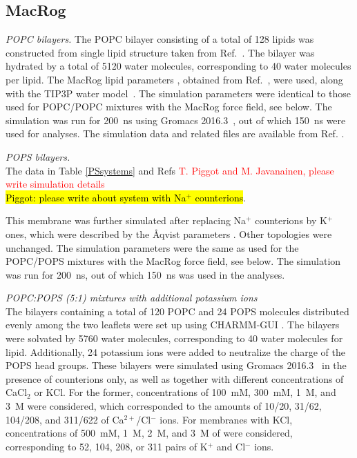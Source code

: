 \documentclass[journal=jpcbfk]{achemso}
\newcommand{\todo}[1]{\textcolor{red}{#1}}
\begin{document}
\subsection{MacRog}
\noindent
{\it POPC bilayers.} 
The POPC bilayer consisting of a total of 128 lipids was constructed from single lipid structure taken 
from Ref.~. The bilayer was hydrated by a total of 5120 water 
molecules, corresponding to 40 water molecules per lipid.
The MacRog lipid parameters \cite{kulig15b}, obtained from Ref.~, were used,
along with the TIP3P water model~\cite{jorgensen83}. The simulation parameters were identical to those used for 
POPC/POPC mixtures with the MacRog force field, see below. The simulation was run for 200~ns using Gromacs 2016.3~\cite{abraham2015gromacs}, 
out of which 150~ns were used for analyses. The simulation data and related files are available from Ref. .

\noindent
{\it POPS bilayers.} \\
The data in Table \ref{PSsystems} and Refs 
\todo{T. Piggot and M. Javanainen, please write simulation details} \\
\hl{Piggot: please write about system with Na$^+$ counterions}.

This membrane was further simulated after replacing Na$^+$ counterions by K$^+$ ones, which 
were described by the \AA{}qvist parameters \cite{aqvist90}. Other topologies
were unchanged. The simulation parameters were the same as used for the POPC/POPS mixtures with 
the MacRog force field, see below. The simulation was run for 200~ns, out of which 150~ns was used 
in the analyses.

\noindent
{\it POPC:POPS (5:1) mixtures with additional potassium ions} \\
The bilayers containing a total of 120 POPC and 24 POPS molecules distributed evenly among the 
two leaflets were set up using CHARMM-GUI \cite{lee16,jo18}.
The bilayers were solvated by 5760 water molecules, corresponding to 40 water molecules for lipid.
Additionally, 24 potassium ions were added to neutralize the charge of the POPS head groups.
These bilayers were simulated using Gromacs 2016.3~\cite{abraham2015gromacs} in the presence of counterions only, as well as together with different
concentrations of CaCl$_2$ or KCl. For the former, concentrations of 100~mM, 300~mM, 1~M, and 3~M 
were considered, which corresponded to the amounts of 10/20, 31/62, 104/208, and 311/622 
of Ca$^{2+}$/Cl$^-$ ions. For membranes with KCl, concentrations of 500~mM, 1~M, 2~M, and 3~M of 
were considered, corresponding to 52, 104, 208, or 311 pairs of K$^+$ and Cl$^-$ ions.
\end{document}
